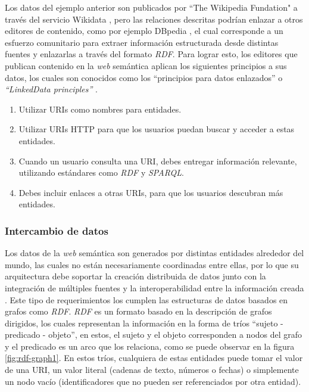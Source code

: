 Los datos del ejemplo anterior son publicados por ``The Wikipedia Fundation" a través del servicio Wikidata \cite{vrandevcic2014wikidata}, pero las relaciones descritas podrían enlazar a otros editores de contenido, como por ejemplo DBpedia \cite{valsecchi2015dbpedia}, el cual corresponde a un esfuerzo comunitario para extraer información estructurada desde distintas fuentes y enlazarlas a través del formato \textit{RDF}. Para lograr esto, los editores que publican contenido en la \textit{web} semántica aplican los siguientes principios a sus datos, los cuales son conocidos como los ``principios para datos enlazados'' o \textit{``LinkedData principles''} \cite{bizer2011linked}.

\begin{enumerate}
    \item Utilizar URIs como nombres para entidades.
    \item Utilizar URIs HTTP para que los usuarios puedan buscar y acceder a estas entidades.
    \item Cuando un usuario consulta una URI, debes entregar información relevante, utilizando estándares como \textit{RDF} y \textit{SPARQL}.
    \item Debes incluir enlaces a otras URIs, para que los usuarios descubran más entidades.
\end{enumerate}

\subsubsection{Intercambio de datos}
\label{sec:intercambio-datos}

Los datos de la \textit{web} semántica son generados por distintas entidades alrededor del mundo, las cuales no están necesariamente coordinadas entre ellas, por lo que su arquitectura debe soportar la creación distribuida de datos junto con la integración de múltiples fuentes y la interoperabilidad entre la información creada \cite{bizer2011linked}. Este tipo de requerimientos los cumplen las estructuras de datos basados en grafos como \textit{RDF}. \textit{RDF} es un formato basado en la descripción de grafos dirigidos, los cuales representan la información en la forma de tríos ``sujeto - predicado - objeto'', en estos, el sujeto y el objeto corresponden a nodos del grafo y el predicado es un arco que los relaciona, como se puede observar en la figura \ref{fig:rdf-graph1}. En estos tríos, cualquiera de estas entidades puede tomar el valor de una URI, un valor literal (cadenas de texto, números o fechas) o simplemente un nodo vacío (identificadores que no pueden ser referenciados por otra entidad).

